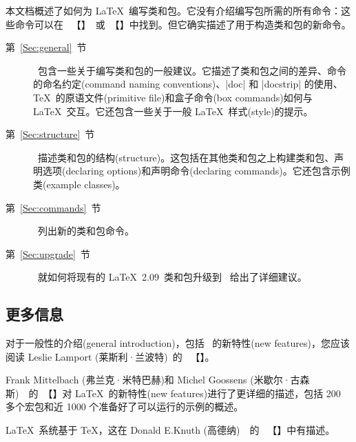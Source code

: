 \documentclass{ltxguide}[1995/11/28]
\newcommand{\heiti}{\CJKfamily{heiti}} %
\newcommand{\kaiti}{\CJKfamily{kaiti}} %
\begin{document}
本文档概述了如何为 \LaTeX{}\ 编写类和包。它{\kaiti 没有}介绍编写包所需的所有命令：这些命令可以在\ {\color{blue} {\emph{\LaTeXbook}}}【{\color{blue}{《\LaTeX：一个文档准备系统》}}】\ 或\ {\color{blue}{\emph{\LaTeXcomp}}}【{}】中找到。但它确实描述了用于构造类和包的新命令。

\begin{description}

\item[第~\ref{Sec:general}~节] \ 包含一些关于编写类和包的一般建议。它描述了类和包之间的差异、命令的命名约定(command naming conventions)、|doc| 和 |docstrip| 的使用、\TeX\ 的原语文件(primitive file)和盒子命令(box commands)如何与 \LaTeX{}\ 交互。它还包含一些关于一般 \LaTeX{}\ 样式(style)的提示。

\item[第~\ref{Sec:structure}~节] \ 描述类和包的结构(structure)。这包括在其他类和包之上构建类和包、声明选项(declaring options)和声明命令(declaring commands)。它还包含示例类(example classes)。

\item[第~\ref{Sec:commands}~节] \ 列出新的类和包命令。

 \item[第~\ref{Sec:upgrade}~节] \ 就如何将现有的 \LaTeX~2.09\ 类和包升级到 \LaTeXe{}\ 给出了详细建议。

\end{description}

\subsection[更多信息]{\heiti 更多信息}

对于一般性的介绍(general introduction)，包括 \LaTeXe\ 的新特性(new features)，您应该阅读 Leslie Lamport (莱斯利·兰波特)~\cite{A-W:LLa94}的\ {\color{blue} {\emph{\LaTeXbook}}}\qquad【{\color{blue}{《\LaTeX：一个文档准备系统》}}】。

Frank Mittelbach (弗兰克·米特巴赫)和 Michel Goossens (米歇尔·古森斯)~\cite{A-W:MG2004}~的\ {}【{}】对 \LaTeX\ 的新特性(new features)进行了更详细的描述，包括 200 多个宏包和近 1000 个准备好了可以运行的示例的概述。

\LaTeX{}\ 系统基于 \TeX{}，这在 Donald E.Knuth (高德纳)~\cite{A-W:DEK91}~的\ {} 【{\color{blue}{《特可爱原本》}}】中有描述。
\end{document}
